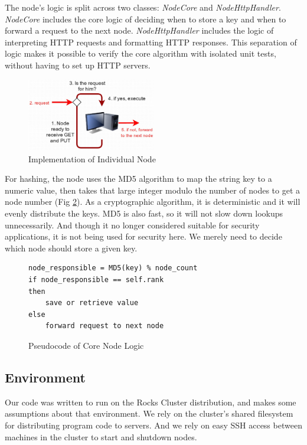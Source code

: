 \documentclass[11pt,conference]{IEEEtran}
\begin{document}
The node's logic is split across two classes: \textit{NodeCore} and
\textit{NodeHttpHandler}. \textit{NodeCore} includes the core logic of deciding
when to store a key and when to forward a request to the next node.
\textit{NodeHttpHandler} includes the logic of interpreting HTTP requests and
formatting HTTP responses. This separation of logic makes it possible to verify
the core algorithm with isolated unit tests, without having to set up HTTP
servers.

\begin{figure}[h!]
  \centering
    \includegraphics[width=0.5\textwidth]{node}
    \caption{Implementation of Individual Node}
    \label{fig:node}
\end{figure}


For hashing, the node uses the MD5 algorithm to map the string key to a numeric
value, then takes that large integer modulo the number of nodes to get a node
number (Fig \ref{fig:hash_algo}). As a cryptographic algorithm, it is
deterministic and it will evenly distribute the keys. MD5 is also
fast\cite{md5rfc}, so it will not slow down lookups unnecessarily. And though it
no longer considered suitable for security applications\cite{md5badrfc}, it is
not being used for security here. We merely need to decide which node should
store a given key.

\begin{figure}[h!]
\caption{Pseudocode of Core Node Logic}
\begin{lstlisting}
node_responsible = MD5(key) % node_count
if node_responsible == self.rank
then
    save or retrieve value
else
    forward request to next node
\end{lstlisting}
\label{fig:hash_algo}
\end{figure}


\subsection{Environment}

Our code was written to run on the Rocks Cluster distribution\cite{rocks}, and
makes some assumptions about that environment. We rely on the cluster's shared
filesystem for distributing program code to servers. And we rely on easy SSH
access between machines in the cluster to start and shutdown nodes.
\end{document}
